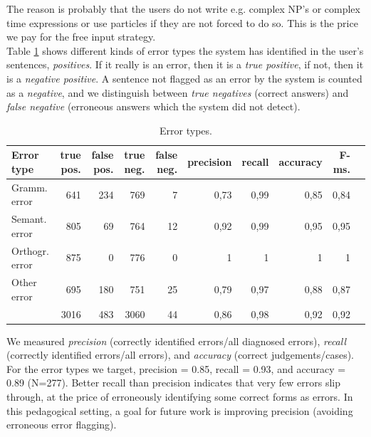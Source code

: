 \documentclass[11pt]{article}
\begin{document}
The reason is probably that the users do not write e.g. complex NP's or complex time expressions or use particles if they are not forced to do so. This is the price we pay for the free input strategy.  \\


Table \ref{errortypes} shows different kinds of error types the system has identified in the user's sentences, \textit{positives}. If it really is an error, then it is a \textit{true positive}, if not, then it is a \textit{negative positive}. A sentence not flagged as an error by the system is counted as a \textit{negative}, and we distinguish between \textit{true negatives} (correct answers) and \textit{false negative} (erroneous answers which the system did not detect). \\

\begin{table}[hbtp]
\begin{center}
\begin{tabular}{|l|r|r|r|r||r|r|r|r|r|}
\hline
Error type	& true pos.		& false pos.		& true neg.		& false neg.	& precision	 & recall	& accuracy	& F-ms. \\
\hline
Gramm. error    &   641   &   234   &   769    &   7    &   0,73   &   0,99   &   0,85   &   0,84	  \\
Semant. error       &   805   &   69    &   764    &   12   &   0,92   &   0,99   &   0,95   &   0,95		  \\
Orthogr. error      &   875   &   0     &   776    &   0    &   1      &   1      &   1      &   1					  \\
Other error     &   695   &   180   &   751    &   25   &   0,79   &   0,97   &   0,88   &   0,87	  \\
\hline
  &   3016  &   483   &   3060   &   44   &   0,86   &   0,98   &   0,92   &   0,92			  \\
\hline
\end{tabular}
\caption{Error types.}
\label{errortypes}
\end{center}
\end{table}%

We measured \textit{precision} (correctly identified errors/all diagnosed errors), \textit{recall} (correctly identified errors/all errors), and \textit{accuracy} (correct judgements/cases). For the error types we target, precision = 0.85, recall = 0.93, and accuracy = 0.89 (N=277). Better recall than precision indicates that very few errors slip through, at the price of erroneously identifying some correct forms as errors. In this pedagogical setting, a goal for future work is improving precision (avoiding erroneous error flagging).
\end{document}
